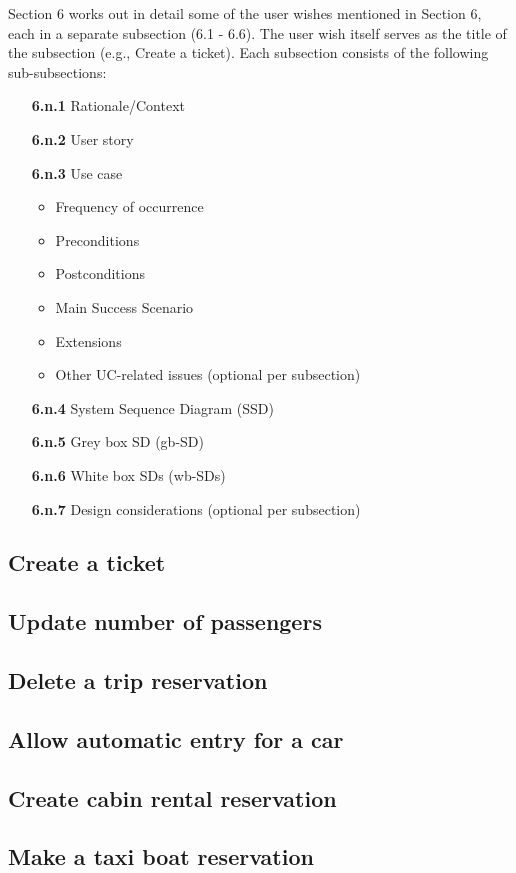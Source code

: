 Section 6 works out in detail some of the user wishes mentioned in Section 6, each in a separate subsection (6.1 - 6.6). The
user wish itself serves as the title of the subsection (e.g., Create a ticket). Each subsection consists of the
following sub-subsections:
\begin{enumerate}
    \item[\textbf{6.n.1}] Rationale/Context
    \item[\textbf{6.n.2}] User story
    \item[\textbf{6.n.3}] Use case
    \begin{itemize}
        \item Frequency of occurrence
        \item Preconditions
        \item Postconditions
        \item Main Success Scenario
        \item Extensions
        \item Other UC-related issues (optional per subsection)
    \end{itemize}
    \item[\textbf{6.n.4}] System Sequence Diagram (SSD)
    \item[\textbf{6.n.5}] Grey box SD (gb-SD)
    \item[\textbf{6.n.6}] White box SDs (wb-SDs)
    \item[\textbf{6.n.7}] Design considerations (optional per subsection)
\end{enumerate}
\newpage

\subsection{Create a ticket}

\newpage

\subsection{Update number of passengers}

\newpage

\subsection{Delete a trip reservation}

\newpage

\subsection{Allow automatic entry for a car}

\newpage

\subsection{Create cabin rental reservation}

\newpage

\subsection{Make a taxi boat reservation}

\newpage